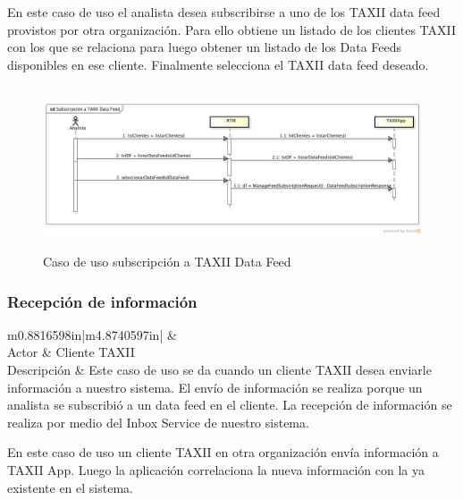 \bigskip

En este caso de uso el analista desea subscribirse a uno de los TAXII data feed provistos por otra organización. Para
ello obtiene un listado de los clientes TAXII con los que se relaciona para luego obtener un listado de los Data Feeds
disponibles en ese cliente. Finalmente selecciona el TAXII data feed deseado.

\begin{figure}[H]
	\centering
	\includegraphics[width=5.4217in,height=1.8965in]{Analisis22-img/Analisis22-img027.png}
	\caption{Caso de uso subscripción a TAXII Data Feed}
	\label{fig.subscripciontaxiidatafeed}

\end{figure}

\subsubsection{Recepción de información}
\begin{flushleft}
	\tablefirsthead{}
	\tablehead{}
	\tabletail{}
	\tablelasttail{}
	\begin{supertabular}{m{0.8816598in}|m{4.8740597in}|}
		 &
		\\\hline
		{Actor} &
		{Cliente TAXII}\\
		{Descripción} &
		{Este caso de uso se da cuando un cliente TAXII desea enviarle información a
			nuestro sistema. El envío de información se realiza porque un analista se subscribió a un data feed en el cliente. La
			recepción de información se realiza por medio del Inbox Service de nuestro sistema.}\\\hhline{~-}
	\end{supertabular}
\end{flushleft}

\bigskip
	En este caso de uso un cliente TAXII en otra organización envía información a TAXII App. Luego la aplicación
	correlaciona la nueva información con la ya existente en el sistema.
	
